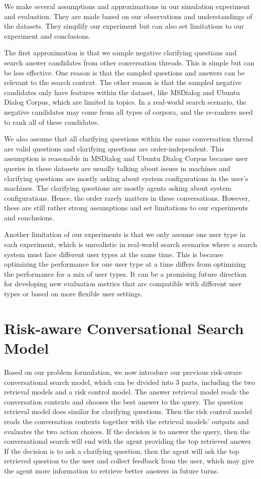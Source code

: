\documentclass[format=acmsmall, review=False, screen=true]{acmart}
\begin{document}
We make several assumptions and approximations in our simulation experiment and evaluation. They are made based on our observations and understandings of the datasets. They simplify our experiment but can also set limitations to our experiment and conclusions.

The first approximation is that we sample negative clarifying questions and search answer candidates from other conversation threads. This is simple but can be less effective. One reason is that the sampled questions and answers can be relevant to the search context. The other reason is that the sampled negative candidates only have features within the dataset, like MSDialog and Ubuntu Dialog Corpus, which are limited in topics. In a real-world search scenario, the negative candidates may come from all types of corpora, and the re-rankers need to rank all of these candidates.

We also assume that all clarifying questions within the same conversation thread are valid questions and clarifying questions are order-independent. This assumption is reasonable in MSDialog and Ubuntu Dialog Corpus because user queries in these datasets are usually talking about issues in machines and clarifying questions are mostly asking about system configurations in the user's machines. The clarifying questions are mostly agents asking about system configurations. Hence, the order rarely matters in these conversations. However, these are still rather strong assumptions and set limitations to our experiments and conclusions.

Another limitation of our experiments is that we only assume one user type in each experiment, which is unrealistic in real-world search scenarios where a search system must face different user types at the same time. This is because optimizing the performance for one user type at a time differs from optimizing the performance for a mix of user types. It can be a promising future direction for developing new evaluation metrics that are compatible with different user types or based on more flexible user settings.

\section{Risk-aware Conversational Search Model}
Based on our problem formulation, we now introduce our previous risk-aware conversational search model, which can be divided into 3 parts, including the two retrieval models and a risk control model. The answer retrieval model reads the conversation contexts and chooses the best answer to the query. The question retrieval model does similar for clarifying questions. Then the risk control model reads the conversation contexts together with the retrieval models' outputs and evaluates the two action choices. If the decision is to answer the query, then the conversational search will end with the agent providing the top retrieved answer. If the decision is to ask a clarifying question, then the agent will ask the top retrieved question to the user and collect feedback from the user, which may give the agent more information to retrieve better answers in future turns.
\end{document}
